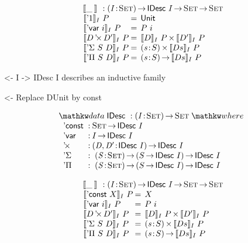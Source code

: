 \documentclass[preprint, authoryear]{sigplanconf}
\newenvironment{structure}{\footnotesize\verbatim}{\endverbatim}
\begin{document}
\[\stk{
\:\:\idescop{\_\:}{}{} : \PI{\V{I}}{\Set} \IDesc{I} \To \Set \To \Set          \\
\begin{array}{l@{\:=\:\:}ll}
\idescop{\DUnit}{I}{P}        &  \Unit                                       \\
\idescop{\DVar{i}}{I}{P}      &  P~i                                         \\
\idescop{\DProd{D}{D'}}{I}{P} &  \TIMES{\idescop{D}{I}{P}}{\idescop{D'}{I}{P}}       \\
\idescop{\DSigma{S}{D}}{I}{P} &  \SIGMA{\V{s}}{S} \idescop{D s}{I}{P}                \\
\idescop{\DPi{S}{D}}{I}{P}    &  \PI{\V{s}}{S} \idescop{D s}{I}{P}            
\end{array}
}\]

\begin{structure}
<- I -> IDesc I describes an inductive family
\end{structure}

\begin{structure}
<- Replace DUnit by const
\end{structure}


\[
\stk{
\data \IDesc{} : \PI{\V{I}}{\Set} \Set \where \\
\;\;\begin{array}{@{}l@{\::\:}l@{\quad}l}
    \DConst{}       & \Set \To \IDesc{I}                                \\
    \DVar{}         & I \To \IDesc{I}                                   \\
    \DProd{}{}      & \PI{\V{D}, \V{D'}}{\IDesc{I}} \IDesc{I}           \\
    \DSigma         & \PI{\V{S}}{\Set} \PIS{S \To \IDesc{I}} \IDesc{I}  \\
    \DPi            & \PI{\V{S}}{\Set} \PIS{S \To \IDesc{I}} \IDesc{I} 
\end{array}
}
\]


\[\stk{
\:\:\idescop{\_\:}{}{} : \PI{\V{I}}{\Set} \IDesc{I} \To \Set \To \Set                  \\
\begin{array}{l@{\:=\:\:}ll}
\idescop{\DConst{X}}{I}{P}    &  X                                                   \\
\idescop{\DVar{i}}{I}{P}      &  P~i                                                 \\
\idescop{\DProd{D}{D'}}{I}{P} &  \TIMES{\idescop{D}{I}{P}}{\idescop{D'}{I}{P}}       \\
\idescop{\DSigma{S}{D}}{I}{P} &  \SIGMA{\V{s}}{S} \idescop{D s}{I}{P}                    \\
\idescop{\DPi{S}{D}}{I}{P}    &  \PI{\V{s}}{S} \idescop{D s}{I}{P}            
\end{array}
}\]
\end{document}
